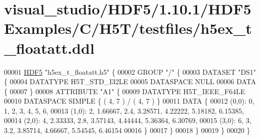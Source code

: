 \hypertarget{visual__studio_2_h_d_f5_21_810_81_2_h_d_f5_examples_2_c_2_h5_t_2testfiles_2h5ex__t__floatatt_8ddl_source}{}\section{visual\+\_\+studio/\+H\+D\+F5/1.10.1/\+H\+D\+F5\+Examples/\+C/\+H5\+T/testfiles/h5ex\+\_\+t\+\_\+floatatt.ddl}
\label{visual__studio_2_h_d_f5_21_810_81_2_h_d_f5_examples_2_c_2_h5_t_2testfiles_2h5ex__t__floatatt_8ddl_source}

\begin{DoxyCode}
00001 \hyperlink{namespace_h_d_f5}{HDF5} \textcolor{stringliteral}{"h5ex\_t\_floatatt.h5"} \{
00002 GROUP \textcolor{stringliteral}{"/"} \{
00003    DATASET \textcolor{stringliteral}{"DS1"} \{
00004       DATATYPE  H5T\_STD\_I32LE
00005       DATASPACE  NULL
00006       DATA \{
00007       \}
00008       ATTRIBUTE \textcolor{stringliteral}{"A1"} \{
00009          DATATYPE  H5T\_IEEE\_F64LE
00010          DATASPACE  SIMPLE \{ ( 4, 7 ) / ( 4, 7 ) \}
00011          DATA \{
00012          (0,0): 0, 1, 2, 3, 4, 5, 6,
00013          (1,0): 2, 1.66667, 2.4, 3.28571, 4.22222, 5.18182, 6.15385,
00014          (2,0): 4, 2.33333, 2.8, 3.57143, 4.44444, 5.36364, 6.30769,
00015          (3,0): 6, 3, 3.2, 3.85714, 4.66667, 5.54545, 6.46154
00016          \}
00017       \}
00018    \}
00019 \}
00020 \}
\end{DoxyCode}
